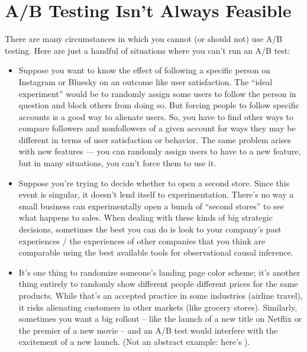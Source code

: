 \documentclass[letterpaper,10pt,english]{jupyterBook}
\begin{document}
\section{A/B Testing Isn’t Always Feasible}
\label{\detokenize{30_questions/50_causal_beyond_ab:a-b-testing-isn-t-always-feasible}}
\sphinxAtStartPar
There are many circumstances in which you cannot (or should not) use A/B testing. Here are just a handful of situations where you can’t run an A/B test:
\begin{itemize}
\item {} 
\sphinxAtStartPar
{} Suppose you want to know the effect of following a specific person on Instagram or Bluesky on an outcome like user satisfaction. The “ideal experiment” would be to randomly assign some users to follow the person in question and block others from doing so. But forcing people to follow specific accounts is a good way to alienate users. So, you have to find other ways to compare followers and non\sphinxhyphen{}followers of a given account for ways they may be different in terms of user satisfaction or behavior. The same problem arises with new features — you can randomly assign users to have  to a new feature, but in many situations, you can’t force them to use it.

\item {} 
\sphinxAtStartPar
{} Suppose you’re trying to decide whether to open a second store. Since this event is singular, it doesn’t lend itself to experimentation. There’s no way a small business can experimentally open a bunch of “second stores” to see what happens to sales. When dealing with these kinds of big strategic decisions, sometimes the best you can do is look to your company’s past experiences / the experiences of other companies that you think are comparable using the best available tools for observational causal inference.

\item {} 
\sphinxAtStartPar
{} It’s one thing to randomize someone’s landing page color scheme; it’s another thing entirely to randomly show different people different prices for the same products. While that’s an accepted practice in some industries (airline travel), it risks alienating customers in other markets (like grocery stores). Similarly, sometimes you want a big rollout – like the launch of a new title on Netflix or the premier of a new movie – and an A/B test would interfere with the excitement of a new launch. (Not an abstract example: here’s ).


\end{itemize}
\end{document}
